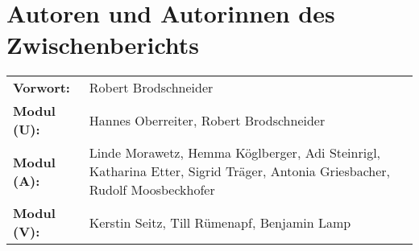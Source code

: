 {}
\section*{Autoren und Autorinnen des Zwischenberichts}
\label{cha:authoren}

\vspace{20mm}


\begin{tabularx}{\textwidth}{l X} 

    \textbf{Vorwort:} &
    Robert Brodschneider \\

    \textbf{Modul (U):} &
    Hannes Oberreiter, Robert Brodschneider \\

    \textbf{Modul (A):} &
    Linde Morawetz, Hemma Köglberger, Adi Steinrigl, \newline
     Katharina Etter, Sigrid Träger, Antonia Griesbacher, Rudolf Moosbeckhofer \\

    \textbf{Modul (V):} &
    Kerstin Seitz, Till Rümenapf, Benjamin Lamp \\

\end{tabularx}